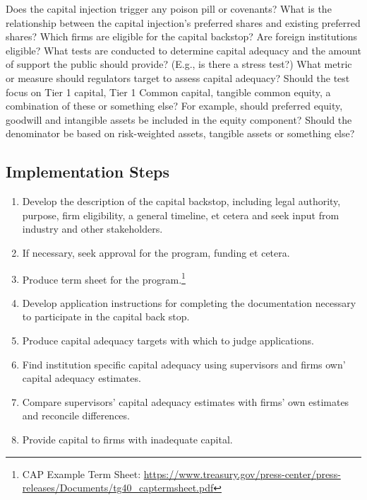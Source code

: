 \documentclass[12pt]{article}
\begin{document}
\begin{outline}[enumerate]
\2 Does the capital injection trigger any poison pill or covenants?
\2 What is the relationship between the capital injection's preferred shares and existing preferred shares? 
\1 Which firms are eligible for the capital backstop? 
\2 Are foreign institutions eligible?
\2 What tests are conducted to determine capital adequacy and the amount of support the public should provide? (E.g., is there a stress test?)
\2 What metric or measure should regulators target to assess capital adequacy?
\3 Should the test focus on Tier 1 capital, Tier 1 Common capital, tangible common equity, a combination of these or something else?
\4 For example, should preferred equity, goodwill and intangible assets be included in the equity component?
\4 Should the denominator be based on risk-weighted assets, tangible assets or something else?

\end{outline}

\subsection{Implementation Steps}

\begin{enumerate}

\item Develop the description of the capital backstop, including legal authority, purpose, firm eligibility, a general timeline, et cetera and seek input from industry and other stakeholders.
\item If necessary, seek approval for the program, funding et cetera.
\item Produce term sheet for the program.\footnote{CAP Example Term Sheet: \newline \url{https://www.treasury.gov/press-center/press-releases/Documents/tg40_captermsheet.pdf}}
\item Develop application instructions for completing the documentation necessary to participate in the capital back stop.
\item Produce capital adequacy targets with which to judge applications.
\item Find institution specific capital adequacy using supervisors and firms own' capital adequacy estimates. 
\item Compare supervisors' capital adequacy estimates with firms' own estimates and reconcile differences.
\item Provide capital to firms with inadequate capital. 

\end{enumerate}
\end{document}
